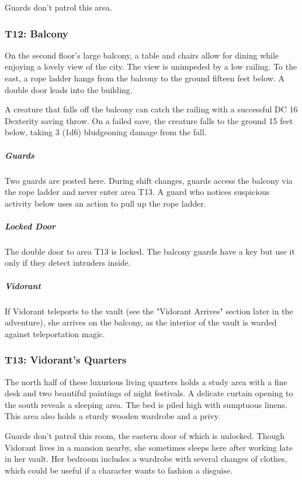 \documentclass[10pt,a4paper,twoside,bg=print,twocolumn,openany,nodeprecatedcode]{dndbook}
\begin{document}
Guards don't patrol this area.

\subsubsection{T12: Balcony}
\begin{DndReadAloud}{}
On the second floor's large balcony, a table and chairs allow for dining while enjoying a lovely view of the city. The view is unimpeded by a low railing. To the east, a rope ladder hangs from the balcony to the ground fifteen feet below. A double door leads into the building.

\end{DndReadAloud}

A creature that falls off the balcony can catch the railing with a successful DC 16 Dexterity saving throw. On a failed save, the creature falls to the ground 15 feet below, taking 3 (1d6) bludgeoning damage from the fall.

\subparagraph{Guards}
Two guards are posted here. During shift changes, guards access the balcony via the rope ladder and never enter area T13. A guard who notices suspicious activity below uses an action to pull up the rope ladder.

\subparagraph{Locked Door}
The double door to area T13 is locked. The balcony guards have a key but use it only if they detect intruders inside.

\subparagraph{Vidorant}
If Vidorant teleports to the vault (see the "Vidorant Arrives" section later in the adventure), she arrives on the balcony, as the interior of the vault is warded against teleportation magic.

\subsubsection{T13: Vidorant's Quarters}
\begin{DndReadAloud}{}
The north half of these luxurious living quarters holds a study area with a fine desk and two beautiful paintings of night festivals. A delicate curtain opening to the south reveals a sleeping area. The bed is piled high with sumptuous linens. This area also holds a sturdy wooden wardrobe and a privy.

\end{DndReadAloud}

Guards don't patrol this room, the eastern door of which is unlocked. Though Vidorant lives in a mansion nearby, she sometimes sleeps here after working late in her vault. Her bedroom includes a wardrobe with several changes of clothes, which could be useful if a character wants to fashion a disguise.
\end{document}
